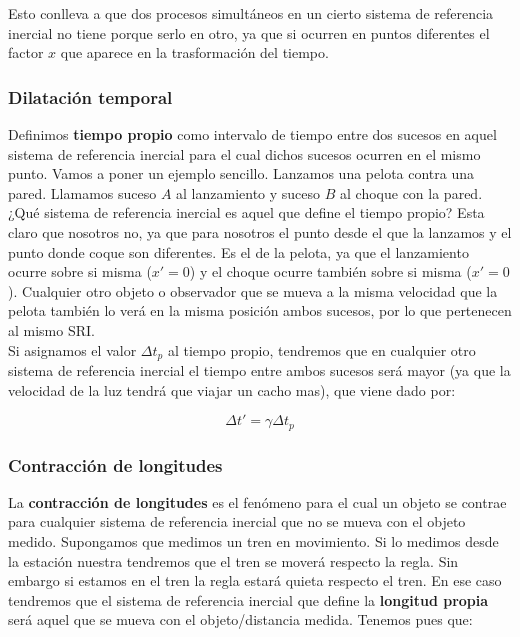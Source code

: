 \documentclass[12pt,a4paper]{article}
\numberwithin{equation}{section}
\numberwithin{figure}{section}
\begin{document}
Esto conlleva a que dos procesos simultáneos en un cierto sistema de referencia inercial no tiene porque serlo en otro, ya que si ocurren en puntos diferentes el factor $x$ que aparece en la trasformación del tiempo. \\

\subsubsection{Dilatación temporal}

Definimos \textbf{tiempo propio} como intervalo de tiempo entre dos sucesos en aquel sistema de referencia inercial para el cual dichos sucesos ocurren en el mismo punto. Vamos a poner un ejemplo sencillo. Lanzamos una pelota contra una pared. Llamamos suceso $A$ al lanzamiento y suceso $B$ al choque con la pared. ¿Qué sistema de referencia inercial es aquel que define el tiempo propio? Esta claro que nosotros no, ya que para nosotros el punto desde el que la lanzamos y el punto donde coque son diferentes. Es el de la pelota, ya que el lanzamiento ocurre sobre si misma ($x'=0$) y el choque ocurre también sobre si misma ($x'=0$). Cualquier otro objeto o observador que se mueva  a la misma velocidad que la pelota también lo verá en la misma posición ambos sucesos, por lo que pertenecen al mismo SRI.  \\

Si asignamos el valor $\Delta t_p$ al tiempo propio, tendremos que en cualquier otro sistema de referencia inercial el tiempo entre ambos sucesos será mayor (ya que la velocidad de la luz tendrá que viajar un cacho mas), que viene dado por:

\begin{equation}
\Delta t' = \gamma \Delta t_p
\end{equation}

\subsubsection{Contracción de longitudes}

La \textbf{contracción de longitudes} es el fenómeno para el cual un objeto se contrae para cualquier sistema de referencia inercial que no se mueva con el objeto medido. Supongamos que medimos un tren en movimiento. Si lo medimos desde la estación nuestra tendremos que el tren se moverá respecto la regla. Sin embargo si estamos en el tren la regla estará quieta respecto el tren. En ese caso tendremos que el sistema de referencia inercial que define la \textbf{longitud propia} será aquel que se mueva con el objeto/distancia medida. Tenemos pues que:
\end{document}
